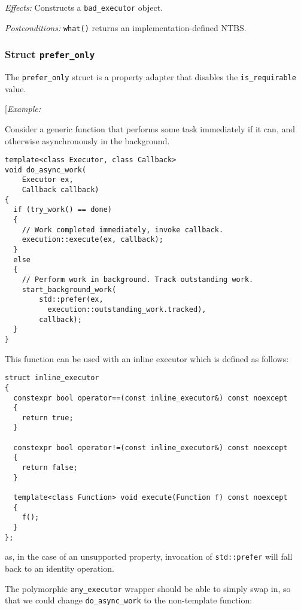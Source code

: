 \documentclass[a4paper,12pt,notitlepage,twoside,openright]{article}
\begin{document}
\emph{Effects:} Constructs a \texttt{bad_executor} object.

\emph{Postconditions:} \texttt{what()} returns an
implementation-defined NTBS.

\hypertarget{struct-prefer_only}{%
\subsubsection{\texorpdfstring{Struct
\texttt{prefer_only}}{Struct }}\label{struct-prefer_only}}

The \texttt{prefer_only} struct is a property adapter that
disables the \texttt{is_requirable} value.

{[}\emph{Example:}

Consider a generic function that performs some task immediately if it
can, and otherwise asynchronously in the background.

\begin{verbatim}
template<class Executor, class Callback>
void do_async_work(
    Executor ex,
    Callback callback)
{
  if (try_work() == done)
  {
    // Work completed immediately, invoke callback.
    execution::execute(ex, callback);
  }
  else
  {
    // Perform work in background. Track outstanding work.
    start_background_work(
        std::prefer(ex,
          execution::outstanding_work.tracked),
        callback);
  }
}
\end{verbatim}

This function can be used with an inline executor which is defined as
follows:

\begin{verbatim}
struct inline_executor
{
  constexpr bool operator==(const inline_executor&) const noexcept
  {
    return true;
  }

  constexpr bool operator!=(const inline_executor&) const noexcept
  {
    return false;
  }

  template<class Function> void execute(Function f) const noexcept
  {
    f();
  }
};
\end{verbatim}

as, in the case of an unsupported property, invocation of
\texttt{std::prefer} will fall back to an identity
operation.

The polymorphic \texttt{any_executor} wrapper should be able
to simply swap in, so that we could change
\texttt{do_async_work} to the non-template function:
\end{document}
